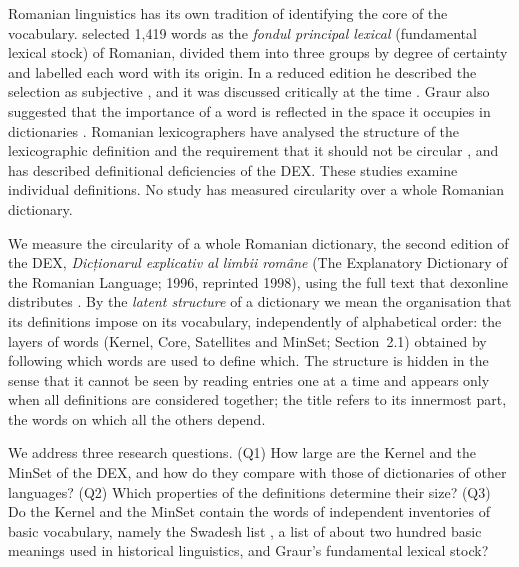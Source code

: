 \documentclass[11pt]{article}
\newcommand{\ro}[1]{\textit{#1}}
\begin{document}
Romanian linguistics has its own tradition of identifying the core of the vocabulary.  selected 1,419 words as the \ro{fondul principal lexical} (fundamental lexical stock) of Romanian, divided them into three groups by degree of certainty and labelled each word with its origin. In a reduced edition he described the selection as subjective \cite{graur1957}, and it was discussed critically at the time \cite{ivanescu1955}. Graur also suggested that the importance of a word is reflected in the space it occupies in dictionaries \cite[pp.~24--25]{graur1954}. Romanian lexicographers have analysed the structure of the lexicographic definition and the requirement that it should not be circular \cite{oprea1976,maranduc2012}, and  has described definitional deficiencies of the DEX. These studies examine individual definitions. No study has measured circularity over a whole Romanian dictionary.

We measure the circularity of a whole Romanian dictionary, the second edition of the DEX, \ro{Dicționarul explicativ al limbii române} (The Explanatory Dictionary of the Romanian Language; 1996, reprinted 1998)\nocite{dex1998}, using the full text that dexonline distributes \cite{dexonline}. By the \emph{latent structure} of a dictionary we mean the organisation that its definitions impose on its vocabulary, independently of alphabetical order: the layers of words (Kernel, Core, Satellites and MinSet; Section~2.1) obtained by following which words are used to define which. The structure is hidden in the sense that it cannot be seen by reading entries one at a time and appears only when all definitions are considered together; the title refers to its innermost part, the words on which all the others depend.

We address three research questions. (Q1) How large are the Kernel and the MinSet of the DEX, and how do they compare with those of dictionaries of other languages? (Q2) Which properties of the definitions determine their size? (Q3) Do the Kernel and the MinSet contain the words of independent inventories of basic vocabulary, namely the Swadesh list \cite{swadesh1955}, a list of about two hundred basic meanings used in historical linguistics, and Graur's fundamental lexical stock?
\end{document}
